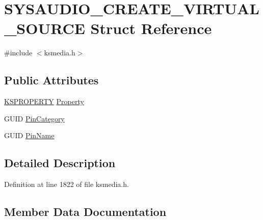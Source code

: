 \hypertarget{struct_s_y_s_a_u_d_i_o___c_r_e_a_t_e___v_i_r_t_u_a_l___s_o_u_r_c_e}{}\section{S\+Y\+S\+A\+U\+D\+I\+O\+\_\+\+C\+R\+E\+A\+T\+E\+\_\+\+V\+I\+R\+T\+U\+A\+L\+\_\+\+S\+O\+U\+R\+CE Struct Reference}
\label{struct_s_y_s_a_u_d_i_o___c_r_e_a_t_e___v_i_r_t_u_a_l___s_o_u_r_c_e}


{\ttfamily \#include $<$ksmedia.\+h$>$}

\subsection*{Public Attributes}
\begin{DoxyCompactItemize}
\item 
\hyperlink{ks_8h_a4392f77c74e868d813d46c39ada4d660}{K\+S\+P\+R\+O\+P\+E\+R\+TY} \hyperlink{struct_s_y_s_a_u_d_i_o___c_r_e_a_t_e___v_i_r_t_u_a_l___s_o_u_r_c_e_aa1cd19ac3e0c1bc18165c73cba298b1e}{Property}
\item 
G\+U\+ID \hyperlink{struct_s_y_s_a_u_d_i_o___c_r_e_a_t_e___v_i_r_t_u_a_l___s_o_u_r_c_e_aa81a93b9d800b031bcc5f8be9ea23208}{Pin\+Category}
\item 
G\+U\+ID \hyperlink{struct_s_y_s_a_u_d_i_o___c_r_e_a_t_e___v_i_r_t_u_a_l___s_o_u_r_c_e_a9d389bab2acfabd009886672b6e8647b}{Pin\+Name}
\end{DoxyCompactItemize}


\subsection{Detailed Description}


Definition at line 1822 of file ksmedia.\+h.



\subsection{Member Data Documentation}
